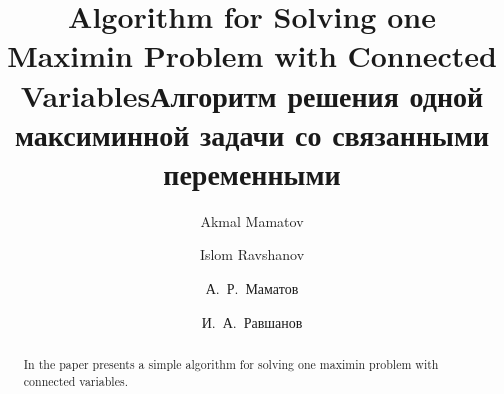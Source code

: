 \begin{englishtitle} %
\title{Algorithm for Solving one Maximin Problem with Connected Variables}
\author{Akmal Mamatov 
 \and
  Islom Ravshanov 
}

\maketitle

\begin{abstract}
In the paper presents a simple algorithm for solving one maximin problem with connected variables.


\end{abstract}
\end{englishtitle}

\iffalse

\documentclass[12pt]{llncs}
\usepackage[T2A]{fontenc}
\usepackage[utf8]{inputenc}
\usepackage[english,russian]{babel}
\usepackage[russian]{nla}





%
\fi

\title{Алгоритм решения одной максиминной задачи со связанными переменными}
\author{А.~Р.~Маматов  
  \and 
  И.~А.~Равшанов
}


\maketitle







